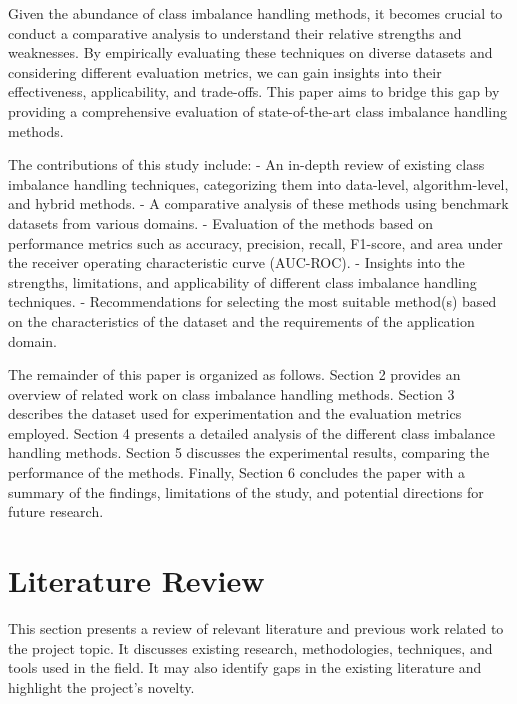 \documentclass[journal]{IEEEtran}
\begin{document}
Given the abundance of class imbalance handling methods, it becomes crucial to conduct a comparative analysis to understand their relative strengths and weaknesses. By empirically evaluating these techniques on diverse datasets and considering different evaluation metrics, we can gain insights into their effectiveness, applicability, and trade-offs. This paper aims to bridge this gap by providing a comprehensive evaluation of state-of-the-art class imbalance handling methods.

The contributions of this study include:
- An in-depth review of existing class imbalance handling techniques, categorizing them into data-level, algorithm-level, and hybrid methods.
- A comparative analysis of these methods using benchmark datasets from various domains.
- Evaluation of the methods based on performance metrics such as accuracy, precision, recall, F1-score, and area under the receiver operating characteristic curve (AUC-ROC).
- Insights into the strengths, limitations, and applicability of different class imbalance handling techniques.
- Recommendations for selecting the most suitable method(s) based on the characteristics of the dataset and the requirements of the application domain.

The remainder of this paper is organized as follows. Section 2 provides an overview of related work on class imbalance handling methods. Section 3 describes the dataset used for experimentation and the evaluation metrics employed. Section 4 presents a detailed analysis of the different class imbalance handling methods. Section 5 discusses the experimental results, comparing the performance of the methods. Finally, Section 6 concludes the paper with a summary of the findings, limitations of the study, and potential directions for future research.











	
	\section{Literature Review}
	\label{sec:literature_review}
	This section presents a review of relevant literature and previous work related to the project topic. It discusses existing research, methodologies, techniques, and tools used in the field. It may also identify gaps in the existing literature and highlight the project's novelty.
	
\end{document}
